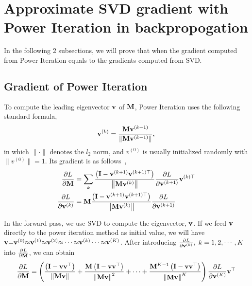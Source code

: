 \section{Approximate SVD gradient with Power Iteration in backpropogation}
In the following 2 subsections, we will prove that when the gradient computed from Power Iteration equals to the gradients computed from SVD.
	\subsection{Gradient of Power Iteration}
	\label{sec: pi}
	To compute the leading eigenvector $\mathbf{v}$ of $\mathbf{M}$, Power Iteration uses the following standard formula,
	\begin{equation}
	\mathbf{v}^{(k)} = \frac{\mathbf{M}\mathbf{v}^{(k-1)}}{\| \mathbf{M}\mathbf{v}^{(k-1)} \|},
	\end{equation}
	in which $\| {\cdot} \|$ denotes the $l_2$ norm, and $v^{(0)}$ is usually initialized randomly with  $\|v^{(0)}\|{=}1$.
    Its gradient is as follows~\cite{ye2017dynamic},
	\begin{equation}
	\begin{aligned} 
	\frac{\partial L}{\partial \mathbf{M}} &=\sum_{k} \frac{\left(\mathbf{I}-\mathbf{v}^{(k+1)} \mathbf{v}^{(k+1)\top}\right)}{\left\|\mathbf{M} \mathbf{v}^{(k)}\right\|} \frac{\partial L}{\partial \mathbf{v}^{(k+1)}} \mathbf{v}^{(k)\top} \\
	\frac{\partial L}{\partial \mathbf{v}^{(k)}} &=\mathbf{M} \frac{\left(\mathbf{I}-\mathbf{v}^{(k+1)} \mathbf{v}^{(k+1)\top}\right)}{\left\|\mathbf{M} \mathbf{v}^{(k)}\right\|} \frac{\partial L}{\partial \mathbf{v}^{(k+1)}} 
	\end{aligned}
	\end{equation}

In the forward pass, we use SVD to compute the eigenvector, $\mathbf{v}$.
If we feed $\mathbf{v}$ directly to the power iteration method as initial value, we will have $\mathbf{v} {=} \mathbf{v}^{(0)} {\approx}\mathbf{v}^{(1)} {\approx} \mathbf{v}^{(2)}{\approx} \cdots {\approx}\mathbf{v}^{(k)} \cdots {\approx}\mathbf{v}^{(K)}$.
After introducing $\frac{\partial L}{\partial \mathbf{v}^{(k)}}, \; k=1,2, \cdots, K$ into $\frac{\partial L}{\partial \mathbf{M}}$, we can obtain
	\begin{equation}
	\frac{\partial L}{\partial \mathbf{M}}
	 = \left( \frac{\left(\mathbf{I}-\mathbf{v} \mathbf{v}^{\top}\right)}{\left\|\mathbf{M} \mathbf{v}\right\|}  +
	 \frac{\mathbf{M} \left(\mathbf{I}-\mathbf{v} \mathbf{v}^{\top}\right)}{\left\|\mathbf{M} \mathbf{v}\right\|^{2}}  + \cdots +
	 \frac{\mathbf{M}^{K-1} \left(\mathbf{I}-\mathbf{v} \mathbf{v}^{\top}\right)}{\left\|\mathbf{M} \mathbf{v}\right\|^{K}} \right) \frac{\partial L}{\partial \mathbf{v}^{(K)}}
	\mathbf{v}^{\top}
	\label{eq: pi_pytorch}
	\end{equation}	

